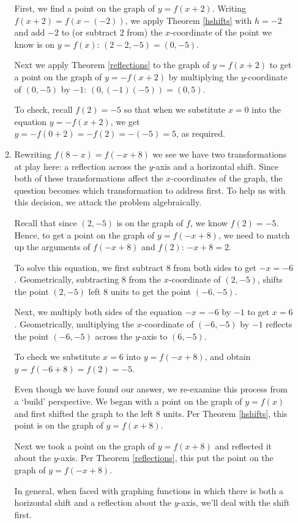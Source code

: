 \begin{ex}
\begin{enumerate}
\begin{enumerate}
 First, we find a point on the graph of $y=f(x+2)$.  Writing $f(x+2) = f(x-(-2))$, we apply Theorem \ref{hshifts} with $h=-2$ and add $-2$ to (or subtract $2$ from) the $x$-coordinate of the point we know is on $y=f(x)$:   $(2-2,-5) =  (0,-5)$. 
 
  Next we apply Theorem \ref{reflections} to the graph of $y=f(x+2)$ to get a point on the graph of $y=-f(x+2)$ by multiplying the $y$-coordinate of $(0,-5)$ by $-1$:  $(0, (-1)(-5)) = (0,5)$.  
  
  To check, recall $f(2)=-5$ so that when we substitute $x=0$ into the equation $y = -f(x+2)$, we get $y=-f(0+2) = -f(2) = -(-5)=5$, as required. 
 
 
 \item  Rewriting  $f(8-x) = f(-x+8)$ we see we have two transformations at play here:  a reflection across the $y$-axis and a horizontal shift.  Since both of these transformations affect the $x$-coordinates of the graph, the question becomes which transformation to address first. To help us with this decision, we attack the problem algebraically.  
 
 Recall that since $(2,-5)$ is on the graph of $f$, we know  $f(2) = -5$.  Hence, to get a point on the graph of $y = f(-x+8)$, we need to match up the arguments of $f(-x+8)$ and $f(2)$:  $-x+8 = 2$.  
 
 To solve this equation, we first subtract $8$ from both sides to get $-x = -6$.   Geometrically,  subtracting $8$ from the $x$-coordinate of $(2,-5)$, shifts the point $(2,-5)$  left $8$ units to get the point $(-6,-5)$.   
 
 Next, we multiply both sides of the equation $-x = -6$ by $-1$ to get $x = 6$.  Geometrically, multiplying the $x$-coordinate of $(-6,-5)$ by $-1$ reflects the point $(-6,-5)$  across the $y$-axis to  $(6,-5)$.   
 
 To check we substitute $x=6$ into $y = f(-x+8)$,  and obtain $y = f(-6+8) = f(2) = -5$. 
 
 Even though we have found our answer, we re-examine this process from a `build' perspective.  We began with a point on the graph of $y=f(x)$ and first shifted the graph to the left $8$ units.   Per Theorem \ref{hshifts}, this point is on the graph of $y=f(x+8)$.  
 
 Next we took a point on the graph of $y=f(x+8)$ and reflected it about the $y$-axis.  Per Theorem \ref{reflections}, this put the point on the graph of $y=f(-x+8)$. 
 
  In general, when faced with graphing functions in which there is both a horizontal shift and a reflection about the $y$-axis, we'll deal with the shift first.
  

\end{enumerate}
\end{enumerate}
\end{ex}
